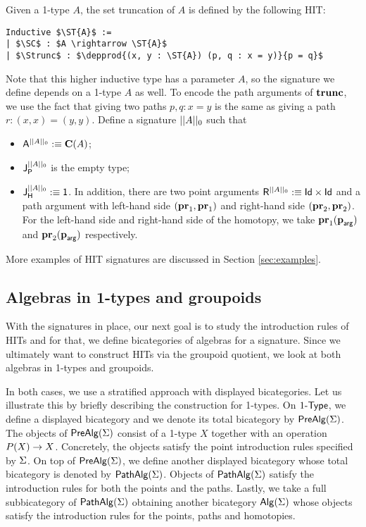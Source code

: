 \begin{example}
\label{ex:settrunc}
Given a 1-type $A$,  the set truncation of $A$ is defined by the following HIT:
\begin{lstlisting}[mathescape=true]
Inductive $\ST{A}$ :=
| $\SC$ : $A \rightarrow \ST{A}$
| $\Strunc$ : $\depprod{(x, y : \ST{A}) (p, q : x = y)}{p = q}$
\end{lstlisting}
Note that this higher inductive type has a parameter $A$,
so the signature we define depends on a 1-type $A$ as well.
To encode the path arguments of $\Strunc$, we use the fact that giving two paths $p, q : x = y$ is the same as giving a path $r : (x, x) = (y, y)$.
Define a signature $\ST{A}$ such that
\begin{itemize}
	\item $\pointconstr[\ST{A}] \eqdef \constantP{A}$;
	\item $\pathlabel[\ST{A}]$ is the empty type;
	\item $\homotlabel[\ST{A}] \eqdef \unit$.
	In addition, there are two point arguments $\homotpointarg[\ST{A}] \eqdef \prodP{\idP}{\idP}$
	and a path argument with left-hand side $\pair{\prle}{\prle}$ and right-hand side $\pair{\prre}{\prre}$.
	For the left-hand side and right-hand side of the homotopy, we take $\hprl{\harg}$ and $\hprr{\harg}$ respectively.
\end{itemize}
\end{example}


More examples of HIT signatures are discussed in Section \ref{sec:examples}.

\subsection{Algebras in 1-types and groupoids}
With the signatures in place, our next goal is to study the introduction rules of HITs and for that, we define bicategories of algebras for a signature.
Since we ultimately want to construct HITs via the groupoid quotient, we look at both algebras in 1-types and groupoids.

In both cases, we use a stratified approach with displayed bicategories.
Let us illustrate this by briefly describing the construction for 1-types.
On $\onetypes$, we define a displayed bicategory and we denote its total bicategory by $\prealg{\sign}$.
The objects of $\prealg{\sign}$ consist of a 1-type $X$ together with an operation $\polyAct{P}{X} \rightarrow X$.
Concretely, the objects satisfy the point introduction rules specified by $\sign$.
On top of $\prealg{\sign}$, we define another displayed bicategory whose total bicategory is denoted by $\pathalg{\sign}$.
Objects of $\pathalg{\sign}$ satisfy the introduction rules for both the points and the paths.
Lastly, we take a full subbicategory of $\pathalg{\sign}$ obtaining another bicategory $\alg(\sign)$ whose objects satisfy the introduction rules for the points, paths and homotopies.

